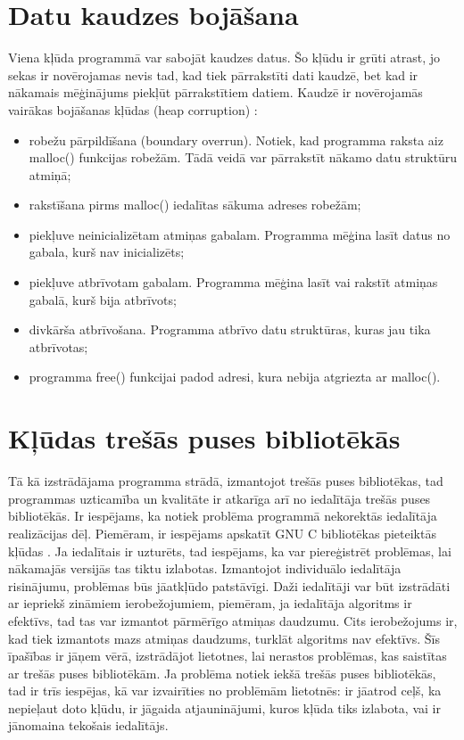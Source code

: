 \section{Datu kaudzes bojāšana}

Viena kļūda programmā var sabojāt kaudzes datus. 
Šo kļūdu ir grūti atrast, jo sekas ir novērojamas nevis tad, kad tiek pārrakstīti dati kaudzē, bet kad ir nākamais mēģinājums piekļūt pārrakstītiem datiem.
Kaudzē ir novērojamās vairākas bojāšanas kļūdas (heap corruption) \cite{DHC}:
\begin{itemize}
\item robežu pārpildīšana (boundary overrun). Notiek, kad programma raksta aiz malloc() funkcijas robežām.
Tādā veidā var pārrakstīt nākamo datu struktūru atmiņā; 
\item rakstīšana pirms malloc() iedalītas sākuma adreses robežām;
\item piekļuve neinicializētam atmiņas gabalam. Programma mēģina lasīt datus no gabala, kurš nav inicializēts;
\item piekļuve atbrīvotam gabalam. Programma mēģina lasīt vai rakstīt atmiņas gabalā, kurš bija atbrīvots;
\item divkārša atbrīvošana. Programma atbrīvo datu struktūras, kuras jau tika atbrīvotas;
\item programma free() funkcijai padod adresi, kura nebija atgriezta ar malloc().
\end{itemize}



\section{Kļūdas trešās puses bibliotēkās}
Tā kā izstrādājama programma strādā, izmantojot trešās puses bibliotēkas, tad programmas uzticamība un kvalitāte ir atkarīga arī no iedalītāja trešās puses bibliotēkās.
Ir iespējams, ka notiek problēma programmā nekorektās iedalītāja realizācijas dēļ.
Piemēram, ir iespējams apskatīt GNU C bibliotēkas pieteiktās kļūdas \cite{MUE}.
Ja iedalītais ir uzturēts, tad iespējams, ka var piereģistrēt problēmas, lai nākamajās versijās tas tiktu izlabotas.
Izmantojot individuālo iedalītāja risinājumu, problēmas būs jāatkļūdo patstāvīgi.  
Daži iedalītāji var būt izstrādāti ar iepriekš zināmiem ierobežojumiem, piemēram, ja iedalītāja algoritms ir efektīvs, tad tas var izmantot pārmērīgo atmiņas daudzumu.
Cits ierobežojums ir, kad tiek izmantots mazs atmiņas daudzums, turklāt algoritms nav efektīvs.
Šīs īpašības ir jāņem vērā, izstrādājot lietotnes, lai nerastos problēmas, kas saistītas ar trešās puses bibliotēkām.
Ja problēma notiek iekšā trešās puses bibliotēkās, tad ir trīs iespējas, kā var izvairīties no problēmām lietotnēs: ir jāatrod ceļš, ka nepieļaut doto kļūdu, ir jāgaida atjauninājumi, kuros kļūda tiks izlabota, vai ir jānomaina tekošais iedalītājs. 


